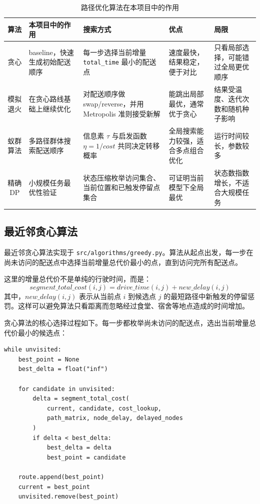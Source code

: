\documentclass[12pt,a4paper,UTF8]{article}
\begin{document}
\begin{table}[H]
\centering
\caption{路径优化算法在本项目中的作用}
\label{tab:algorithm_overview}
\small
\renewcommand{\arraystretch}{1.2}
\begin{tabularx}{\textwidth}{c|X|X|X|X}
\hline
算法 & 本项目中的作用 & 搜索方式 & 优点 & 局限 \\
\hline
贪心 & baseline，快速生成初始配送顺序 & 每一步选择当前增量 \texttt{total\_time} 最小的配送点 & 速度最快，结果稳定，便于对比 & 只看局部选择，可能错过全局更优顺序 \\
\hline
模拟退火 & 在贪心路线基础上继续优化 & 对配送顺序做 swap/reverse，并用 Metropolis 准则接受新解 & 能跳出局部最优，通常优于贪心 & 结果受温度、迭代次数和随机种子影响 \\
\hline
蚁群算法 & 多路径群体搜索配送顺序 & 信息素 $\tau$ 与启发函数 $\eta=1/cost$ 共同决定转移概率 & 全局搜索能力较强，适合多点组合优化 & 运行时间较长，参数较多 \\
\hline
精确 DP & 小规模任务最优性验证 & 状态压缩枚举访问集合、当前位置和已触发停留点集合 & 可证明当前模型下全局最优 & 状态数指数增长，不适合大规模任务 \\
\hline
\end{tabularx}
\end{table}

\subsection{最近邻贪心算法}

最近邻贪心算法实现于 \texttt{src/algorithms/greedy.py}。算法从起点出发，每一步在尚未访问的配送点中选择当前增量总代价最小的点，直到访问完所有配送点。

这里的增量总代价不是单纯的行驶时间，而是：
\[
    segment\_total\_cost(i,j)
    = drive\_time(i,j) + new\_delay(i,j)
\]
其中，$new\_delay(i,j)$ 表示从当前点 $i$ 到候选点 $j$ 的最短路径中新触发的停留惩罚。这样可以避免算法只看距离而忽略经过食堂、宿舍等地点造成的时间增加。

贪心算法的核心选择过程如下。每一步都枚举尚未访问的配送点，选出当前增量总代价最小的候选点：

\begin{lstlisting}[caption={最近邻贪心的候选点选择}]
while unvisited:
    best_point = None
    best_delta = float("inf")

    for candidate in unvisited:
        delta = segment_total_cost(
            current, candidate, cost_lookup,
            path_matrix, node_delay, delayed_nodes
        )
        if delta < best_delta:
            best_delta = delta
            best_point = candidate

    route.append(best_point)
    current = best_point
    unvisited.remove(best_point)
\end{lstlisting}
\end{document}

